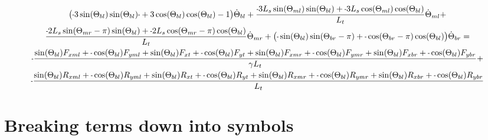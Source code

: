\documentclass[11pt, landscape]{article}
\newcommand{\mn}{\scalebox{0.7}[1.0]{-}}
\begin{document}
\begin{multline}
\big(\mn 3\sin(\Theta_{bl})\sin(\Theta_{bl})\mn + 3\cos(\Theta_{bl})\cos(\Theta_{bl}) -1\big)\dot{\Theta}_{bl} +
\frac{\mn 3L_{s}\sin(\Theta_{ml})\sin(\Theta_{bl}) + \mn 3L_{s}\cos(\Theta_{ml})\cos(\Theta_{bl})}{L_t}\dot{\Theta}_{ml} + \\
\frac{\mn 2L_{s}\sin(\Theta_{mr}-\pi)\sin(\Theta_{bl}) + \mn 2L_{s}\cos(\Theta_{mr}-\pi)\cos(\Theta_{bl})}{L_t}\dot{\Theta}_{mr} +
\big(\mn \sin(\Theta_{bl}) \sin(\Theta_{br}-\pi) + \mn \cos(\Theta_{br}-\pi)\cos(\Theta_{bl})\big) \dot{\Theta}_{br} = \\
\mn \frac{\sin(\Theta_{bl})F_{xml} + \mn\cos(\Theta_{bl})F_{yml} + \sin(\Theta_{bl})F_{xt } + \mn \cos(\Theta_{bl})F_{yt } + \sin(\Theta_{bl})F_{xmr} + \mn \cos(\Theta_{bl})F_{ymr} + \sin(\Theta_{bl})F_{xbr} + \mn \cos(\Theta_{bl})F_{ybr}}{\gamma L_t} + \\
\mn \frac{\sin(\Theta_{bl})R_{xml} + \mn \cos(\Theta_{bl})R_{yml} + \sin(\Theta_{bl})R_{xt } + \mn \cos(\Theta_{bl})R_{yt} + \sin(\Theta_{bl})R_{xmr} + \mn \cos(\Theta_{bl})R_{ymr} + \sin(\Theta_{bl})R_{xbr} + \mn \cos(\Theta_{bl})R_{ybr}}{L_t}
\end{multline}

\section{Breaking terms down into symbols}
\end{document}
